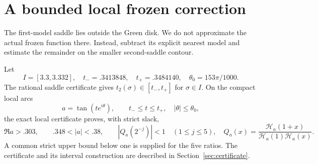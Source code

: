 \documentclass[11pt,a4paper]{article}
\theoremstyle{remark}\newtheorem*{ednote}{Editorial note (ProveIt, 2026-10-01)}
\newcommand{\HH}{\mathcal H}\newcommand{\GG}{\mathcal G}
\begin{document}
\section{A bounded local frozen correction}
The first-model saddle lies outside the Green disk. We do not approximate the actual frozen function there. Instead, subtract its explicit nearest model and estimate the remainder on the smaller second-saddle contour.

Let
\[
 I=[3.3,3.332],\quad
 t_-=.3413848,\quad t_+=.3484140,\quad
 \theta_0=153\pi/1000.
\]
The rational saddle certificate gives $t_2(\sigma)\in[t_-,t_+]$ for $\sigma\in I$. On the compact local arcs
\begin{equation}\label{eq:localset}
 a=\tan(te^{i\theta}),\qquad t_-\le t\le t_+,\quad |\theta|\le\theta_0,
\end{equation}
the exact local certificate proves, with strict slack,
\begin{equation}\label{eq:localconditions}
 \Re a>.303,\qquad .348<|a|<.38,\qquad
 |Q_a(2^{-j})|<1\quad(1\le j\le5),
 \quad Q_a(x)=\frac{\HH_a(1+x)}{\HH_a(1)\HH_a(x)}.
\end{equation}
A common strict upper bound below one is supplied for the five ratios. The certificate and its interval construction are described in Section~\ref{sec:certificate}.
\end{document}
